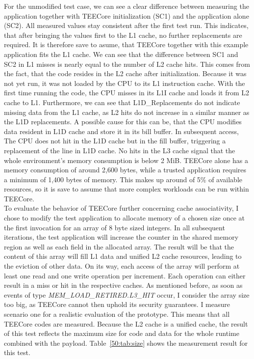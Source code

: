 For the unmodified test case, we can see a clear difference between measuring
the application together with TEECore initialization (SC1) and the application
alone (SC2). All measured values stay consistent after the first test run. This
indicates, that after bringing the values first to the L1 cache, no further
replacements are required. It is therefore save to asume, that TEECore together
with this example application fits the L1 cache. We can see that the difference
between SC1 and SC2 in L1 misses is nearly equal to the number of L2 cache hits.
This comes from the fact, that the code resides in the L2 cache after
initialization. Because it was not yet run, it was not loaded by the CPU to its
L1 instruction cache. With the first time running the code, the CPU misses in
its L1I cache and loads it from L2 cache to L1. Furthermore, we can see that
L1D\_Replacements do not indicate missing data from the L1 cache, as L2 hits do
not increase in a similar manner as the L1D replacements. A possible cause for
this can be, that the CPU modifies data resident in L1D cache and store it in
its bill buffer. In subsequent access, The CPU does not hit in the L1D cache but
in the fill buffer, triggering a replacement of the line in L1D cache. No hits
in the L3 cache signal that the whole environment's memory consumption is below
2 MiB. TEECore alone has a memory consumption of around 2,600 bytes, while a
trusted application requires a minimum of 1,400 bytes of memory. This makes up
around of 5\% of available resources, so it is save to assume that more complex
workloads can be run within TEECore.\\

To evaluate the behavior of TEECore further concerning cache associativity, I
chose to modify the test application to allocate memory of a chosen size once at
the first invocation for an array of 8 byte sized integers. In all subsequent
iterations, the test application will increase the counter in the shared memory
region as well as each field in the allocated array. The result will be that the
content of this array will fill L1 data and unified L2 cache resources, leading
to the eviction of other data. On its way, each access of the array will
perform at least one read and one write operation per increment. Each operation
can either result in a miss or hit in the respective caches. As mentioned
before, as soon as events of type \textit{MEM\_LOAD\_RETIRED.L3\_HIT} occur, I
consider the array size too big, as TEECore cannot then uphold its security
guarantees. I measure scenario one for a realistic evaluation of the prototype.
This means that all TEECore codes are measured. Because the L2 cache is a
unified cache, the result of this test reflects the maximum size for code and
data for the whole runtime combined with the payload. Table~\ref{50:tab:size}
shows the measurement result for this test.


